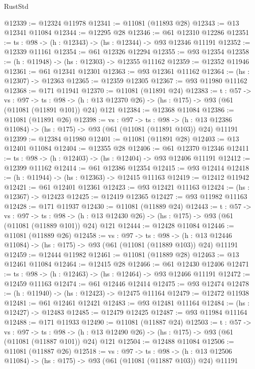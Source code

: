 \begin{lexlean}{RustStd}
\begin{coremodule}
@12339 := @12324 @11978
@12341 := @11081 (@11893 @28)
@12343 := @13 @12341 @11084
@12344 := @12295 @28
@12346 := @61 @12310 @12286
@12351 := {ts : @98} -> (h : @12343) -> (hs : @12344) -> @93 @12346 @11191
@12352 := @12339 @11161
@12354 := @61 @12326 @12294
@12355 := @93 @12354
@12358 := (h : @11948) -> (hs : @12303) -> @12355 @11162
@12359 := @12352 @11946
@12361 := @61 @12341 @12301
@12363 := @93 @12361 @11162
@12364 := (hs : @12307) -> @12363
@12365 := @12359 @12305
@12367 := @93 @11980 @11162
@12368 := @171 @11941
@12370 := @11081 (@11891 @24)
@12383 := {t : @57} ->
  {vs : @97} ->
  {ts : @98} -> (h : @13 @12370 @26) -> (hs : @175) -> @93 (@61 (@11081 (@11891 @101)) @24) @121
@12384 := @12368 @11084
@12386 := @11081 (@11891 @26)
@12398 := {vs : @97} ->
  {ts : @98} ->
  (h : @13 @12386 @11084) -> (hs : @175) -> @93 (@61 (@11081 (@11891 @103)) @24) @11191
@12399 := @12384 @11980
@12401 := @11081 (@11891 @28)
@12403 := @13 @12401 @11084
@12404 := @12355 @28
@12406 := @61 @12370 @12346
@12411 := {ts : @98} -> (h : @12403) -> (hs : @12404) -> @93 @12406 @11191
@12412 := @12399 @11162
@12414 := @61 @12386 @12354
@12415 := @93 @12414
@12418 := (h : @11944) -> (hs : @12363) -> @12415 @11163
@12419 := @12412 @11942
@12421 := @61 @12401 @12361
@12423 := @93 @12421 @11163
@12424 := (hs : @12367) -> @12423
@12425 := @12419 @12365
@12427 := @93 @11982 @11163
@12428 := @171 @11937
@12430 := @11081 (@11889 @24)
@12443 := {t : @57} ->
  {vs : @97} ->
  {ts : @98} -> (h : @13 @12430 @26) -> (hs : @175) -> @93 (@61 (@11081 (@11889 @101)) @24) @121
@12444 := @12428 @11084
@12446 := @11081 (@11889 @26)
@12458 := {vs : @97} ->
  {ts : @98} ->
  (h : @13 @12446 @11084) -> (hs : @175) -> @93 (@61 (@11081 (@11889 @103)) @24) @11191
@12459 := @12444 @11982
@12461 := @11081 (@11889 @28)
@12463 := @13 @12461 @11084
@12464 := @12415 @28
@12466 := @61 @12430 @12406
@12471 := {ts : @98} -> (h : @12463) -> (hs : @12464) -> @93 @12466 @11191
@12472 := @12459 @11163
@12474 := @61 @12446 @12414
@12475 := @93 @12474
@12478 := (h : @11940) -> (hs : @12423) -> @12475 @11164
@12479 := @12472 @11938
@12481 := @61 @12461 @12421
@12483 := @93 @12481 @11164
@12484 := (hs : @12427) -> @12483
@12485 := @12479 @12425
@12487 := @93 @11984 @11164
@12488 := @171 @11933
@12490 := @11081 (@11887 @24)
@12503 := {t : @57} ->
  {vs : @97} ->
  {ts : @98} -> (h : @13 @12490 @26) -> (hs : @175) -> @93 (@61 (@11081 (@11887 @101)) @24) @121
@12504 := @12488 @11084
@12506 := @11081 (@11887 @26)
@12518 := {vs : @97} ->
  {ts : @98} ->
  (h : @13 @12506 @11084) -> (hs : @175) -> @93 (@61 (@11081 (@11887 @103)) @24) @11191

\end{coremodule}
\end{lexlean}

